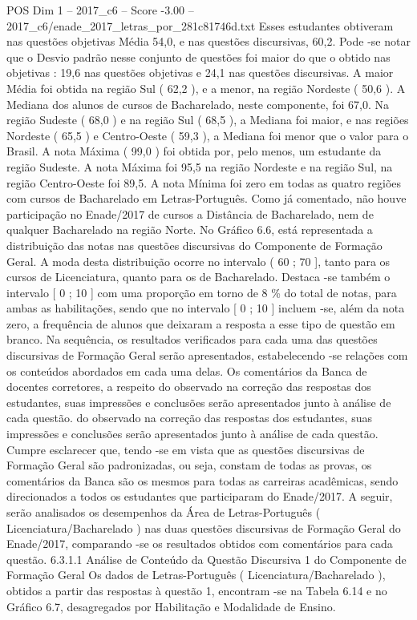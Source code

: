 \begin{textsample}{POS Dim 1 – 2017\_c6 – Score -3.00 – 2017\_c6/enade\_2017\_letras\_por\_281c81746d.txt}
Esses estudantes obtiveram nas questões objetivas Média 54,0, e nas questões discursivas, 60,2.
Pode -se notar que o Desvio padrão nesse conjunto de questões foi maior do que o obtido nas objetivas : 19,6 nas questões objetivas e 24,1 nas questões discursivas.
A maior Média foi obtida na região Sul ( 62,2 ), e a menor, na região Nordeste ( 50,6 ).
A Mediana dos alunos de cursos de Bacharelado, neste componente, foi 67,0.
Na região Sudeste ( 68,0 ) e na região Sul ( 68,5 ), a Mediana foi maior, e nas regiões Nordeste ( 65,5 ) e Centro-Oeste ( 59,3 ), a Mediana foi menor que o valor para o Brasil.
A nota Máxima ( 99,0 ) foi obtida por, pelo menos, um estudante da região Sudeste.
A nota Máxima foi 95,5 na região Nordeste e na região Sul, na região Centro-Oeste foi 89,5.
A nota Mínima foi zero em todas as quatro regiões com cursos de Bacharelado em Letras-Português.
Como já comentado, não houve participação no Enade/2017 de cursos a Distância de Bacharelado, nem de qualquer Bacharelado na região Norte.
No Gráfico 6.6, está representada a distribuição das notas nas questões discursivas do Componente de Formação Geral.
A moda desta distribuição ocorre no intervalo ( 60 ; 70 ], tanto para os cursos de Licenciatura, quanto para os de Bacharelado.
Destaca -se também o intervalo [ 0 ; 10 ] com uma proporção em torno de 8 \% do total de notas, para ambas as habilitações, sendo que no intervalo [ 0 ; 10 ] incluem -se, além da nota zero, a frequência de alunos que deixaram a resposta a esse tipo de questão em branco.
Na sequência, os resultados verificados para cada uma das questões discursivas de Formação Geral serão apresentados, estabelecendo -se relações com os conteúdos abordados em cada uma delas.
Os comentários da Banca de docentes corretores, a respeito do observado na correção das respostas dos estudantes, suas impressões e conclusões serão apresentados junto à análise de cada questão. do observado na correção das respostas dos estudantes, suas impressões e conclusões serão apresentados junto à análise de cada questão.
Cumpre esclarecer que, tendo -se em vista que as questões discursivas de Formação Geral são padronizadas, ou seja, constam de todas as provas, os comentários da Banca são os mesmos para todas as carreiras acadêmicas, sendo direcionados a todos os estudantes que participaram do Enade/2017.
A seguir, serão analisados os desempenhos da Área de Letras-Português ( Licenciatura/Bacharelado ) nas duas questões discursivas de Formação Geral do Enade/2017, comparando -se os resultados obtidos com comentários para cada questão. 6.3.1.1 Análise de Conteúdo da Questão Discursiva 1 do Componente de Formação Geral Os dados de Letras-Português ( Licenciatura/Bacharelado ), obtidos a partir das respostas à questão 1, encontram -se na Tabela 6.14 e no Gráfico 6.7, desagregados por Habilitação e Modalidade de Ensino.

\end{textsample}
